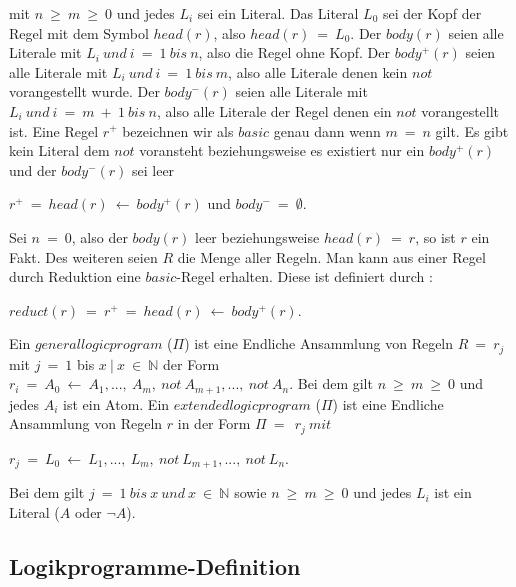 mit $n~\geq~m~\geq~0$ und jedes $L_i$ sei ein Literal.
Das Literal $L_0$ sei der Kopf der Regel mit dem Symbol $head(r)$,
also $head(r)~=~L_0$. Der $body(r)$ seien alle Literale mit
$L_i~und~i~=~1~bis~n$, also die Regel ohne Kopf. Der $body^+(r)$ seien alle Literale mit $L_i~und~i~=~1~bis~m$, also alle Literale denen kein $not$
vorangestellt wurde. Der $body^-(r)$ seien alle Literale mit
$L_i~und~i~=~m~+~1~bis~n$, also alle Literale der Regel denen
ein $not$ vorangestellt ist.
Eine Regel $r^+$ bezeichnen wir als $basic$ genau dann wenn
$m~=~n$ gilt. Es gibt kein Literal dem $not$ voransteht beziehungsweise es
existiert nur ein $body^+(r)$ und der $body^-(r)$ sei leer 

\begin{center}
	$r^+~=~head(r)~\leftarrow~body^+(r)$ und $body^-~=~\emptyset$. \\
\end{center}	

Sei $n~=~0$, also der $body(r)$ leer beziehungsweise $head(r)~=~r$,
so ist $r$ ein Fakt. Des weiteren seien $R$ die Menge
aller Regeln. Man kann aus einer Regel durch Reduktion eine $basic$-Regel
erhalten. Diese ist definiert durch :

\begin{center}
  $reduct(r)~=~r^+~=~head(r)~\leftarrow~body^+(r)$.\\
\end{center}

Ein $general logic program$ ($\Pi$)  ist eine Endliche Ansammlung von
Regeln $R~=~r_j$ mit $j~=~1$ bis $x~|~x~\in~\mathbb{N}$ der Form\\
$r_i~=~A_0~\leftarrow~A_1,...,~A_m,~not~A_{m+1},...,~not~A_n$. Bei dem gilt
$n~\geq~m~\geq~0$ und jedes $A_i$ ist ein Atom.
Ein $extended logic program$ ($\Pi$) ist eine Endliche Ansammlung
von Regeln $r$ in der Form $\Pi~=~~r_j~mit$

\begin{center}
	$r_j~=~L_0~\leftarrow~L_1,...,~L_m,~not~L_{m+1},...,~not~L_n$. \\
\end{center}

Bei dem gilt $j~=~1~bis~x~und~x~\in~\mathbb{N}$ sowie $n~\geq~m~\geq~0$ und
jedes $L_i$ ist ein Literal ($A$ oder $\neg A$).\\


\subsection{Logikprogramme-Definition}

